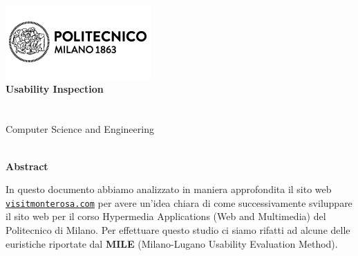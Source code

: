 \makeatletter
\begin{titlepage}
	\begin{center} 
		\includegraphics{resources/images/logo_polimi.png}\\[4ex]
		{\Huge \bfseries \sffamily Usability Inspection}\\[2ex]
		{\huge \bfseries \sffamily \@title }\\[8ex] 
		{\Large  \@author}\\[5ex] 
		Computer Science and Engineering\\[5ex]
		\@date\\[5ex]
		\fontsize{15pt}{12pt}\selectfont
 
	\vspace{\fill}
		\large \textbf{Abstract}
	\end{center}
	\begin{flushleft} 
		In questo documento abbiamo analizzato in maniera approfondita il sito
		web \href{https://www.visitmonterosa.com/}{\texttt{visitmonterosa.com}}
		per avere un'idea chiara di come successivamente sviluppare il sito web
		per il corso Hypermedia Applications (Web and Multimedia) del
		Politecnico di Milano. Per effettuare questo studio ci siamo rifatti ad
		alcune delle euristiche riportate dal \textbf{MILE} (Milano-Lugano
		Usability Evaluation Method).
	\end{flushleft}
\end{titlepage}
\makeatother 
\thispagestyle{empty}
\setcounter{page}{1} %